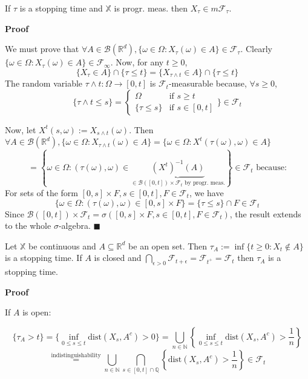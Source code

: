 \begin{proposition}
    If $\tau$ is a stopping time and $\mathbb{X}$ is progr. meas. then $X_{\tau} \in m\mathcal{F}_{\tau}$.
\end{proposition}

\textbf{Proof}

We must prove that $\forall A \in \mathcal{B}(\mathbb{R}^d), \{\omega \in \Omega: X_{\tau}(\omega) \in A\} \in \mathcal{F}_{\tau}$.
Clearly $\{\omega \in \Omega: X_{\tau}(\omega) \in A\} \in \mathcal{F}_{\infty}$. Now, for any $t \geq 0$,
$$\{X_{\tau} \in A\} \cap \{\tau \leq t\} = \{X_{\tau \wedge t} \in A\} \cap \{\tau \leq t\}$$
The random variable $\tau \wedge t: \Omega \to [0,t]$ is $\mathcal{F}_t$-measurable because, $\forall s \geq 0$,
$$\{\tau \wedge t \leq s\} = \begin{cases} \Omega & \text{if } s \geq t \\ \{\tau \leq s\} & \text{if } s \in [0,t] \end{cases} \bigg\} \in \mathcal{F}_t$$

Now, let $X^t(s, \omega) := X_{s \wedge t}(\omega)$.
Then $\forall A \in \mathcal{B}(\mathbb{R}^d), \{\omega \in \Omega: X_{\tau \wedge t}(\omega) \in A\} = \{\omega \in \Omega: X^t(\tau(\omega), \omega) \in A\}$
$$= \left\{\omega \in \Omega: (\tau(\omega), \omega) \in \underbrace{(X^t)^{-1}(A)}_{\in \mathcal{B}([0,t]) \times \mathcal{F}_t \text{ by progr. meas.}} \right\} \in \mathcal{F}_t \text{ because:}$$
For sets of the form $[0,s] \times F, s \in [0,t], F \in \mathcal{F}_t$, we have
$$\{\omega \in \Omega: (\tau(\omega), \omega) \in [0,s] \times F\} = \{\tau \leq s\} \cap F \in \mathcal{F}_t$$
Since $\mathcal{B}([0,t]) \times \mathcal{F}_t = \sigma([0,s] \times F, s \in [0,t], F \in \mathcal{F}_t)$, the result extends to the whole $\sigma$-algebra. $\blacksquare$

\begin{proposition}
    Let $\mathbb{X}$ be continuous and $A \subseteq \mathbb{R}^d$ be an open set. Then $\tau_A := \inf\{t \geq 0: X_t \notin A\}$ is a stopping time.
    If $A$ is closed and $\bigcap_{\epsilon > 0} \mathcal{F}_{t+\epsilon} = \mathcal{F}_{t^+} = \mathcal{F}_t$ then $\tau_A$ is a stopping time.
\end{proposition}

\textbf{Proof}

If $A$ is open:

$$\{\tau_A > t\} = \{\inf_{0 \leq s \leq t} \text{dist}(X_s, A^c) > 0\} = \bigcup_{n \in \mathbb{N}} \left\{\inf_{0 \leq s \leq t} \text{dist}(X_s, A^c) > \frac{1}{n}\right\}$$
$$\overset{\text{indistinguishability}}{=} \bigcup_{n \in \mathbb{N}} \bigcap_{s \in [0,t] \cap \mathbb{Q}} \left\{\text{dist}(X_s, A^c) > \frac{1}{n}\right\} \in \mathcal{F}_t$$

